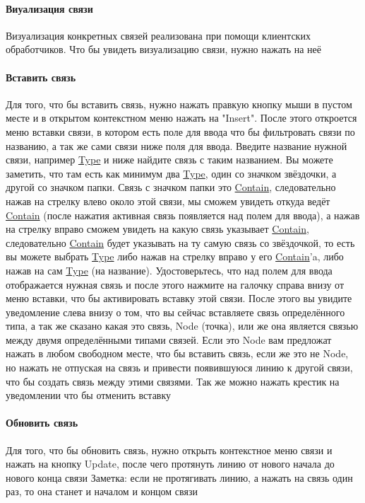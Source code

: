 \documentclass{article}
\begin{document}
\paragraph{Виуализация связи}
Визуализация конкретных связей реализована при помощи клиентских обработчиков.
Что бы увидеть визуализацию связи, нужно нажать на неё
\paragraph{Вставить связь}
Для того, что бы \hypertarget{DeepCase.InsertLink.Description}{вставить связь}, нужно
нажать правкую кнопку мыши в пустом
месте и в открытом контекстном меню нажать на "Insert". После этого откроется
меню вставки связи, в котором есть поле для ввода что бы фильтровать связи по
названию, а так же сами связи ниже поля для ввода. Введите название нужной
связи, например \hyperlink{Core.Type.Description}{Type} и ниже найдите связь с таким
названием. Вы можете
заметить, что там есть как минимум два \hyperlink{Core.Type.Description}{Type}, один со
значком звёздочки, а
другой со значком папки. Связь с значком папки это
\hyperlink{Core.Contain.Description}{Contain}, следовательно нажав
на стрелку влево около этой связи, мы сможем увидеть откуда ведёт
\hyperlink{Core.Contain.Description}{Contain}
(после нажатия активная связь появляется над полем для ввода), а нажав на
стрелку вправо сможем увидеть на какую связь указывает
\hyperlink{Core.Contain.Description}{Contain}, следовательно
\hyperlink{Core.Contain.Description}{Contain} будет указывать на ту самую связь со
звёздочкой, то есть вы можете
выбрать \hyperlink{Core.Type.Description}{Type} либо нажав на стрелку вправо у его
\hyperlink{Core.Contain.Description}{Contain}'a, либо нажав на сам
\hyperlink{Core.Type.Description}{Type} (на название). Удостоверьтесь, что над полем для
ввода отображается нужная
связь и после этого нажмите на галочку справа внизу от меню вставки, что бы
активировать вставку этой связи. После этого вы увидите уведомление слева внизу
о том, что вы сейчас вставляете связь определённого типа, а так же сказано
какая это связь, Node (точка), или же она является связью между двумя
определёнными типами связей. Если это Node вам предложат нажать в любом
свободном месте, что бы вставить связь, если же это не Node, но нажать не
отпуская на связь и привести появившуюся линию к другой связи, что бы создать
связь между этими связями. Так же можно нажать крестик на уведомлении что бы
отменить вставку
\paragraph{Обновить связь}
Для того, что бы обновить связь, нужно открыть контекстное меню связи и нажать
на кнопку Update, после чего протянуть линию от нового начала до нового конца
связи
Заметка: если не протягивать линию, а нажать на связь один раз, то она станет и
началом и концом связи
\end{document}
